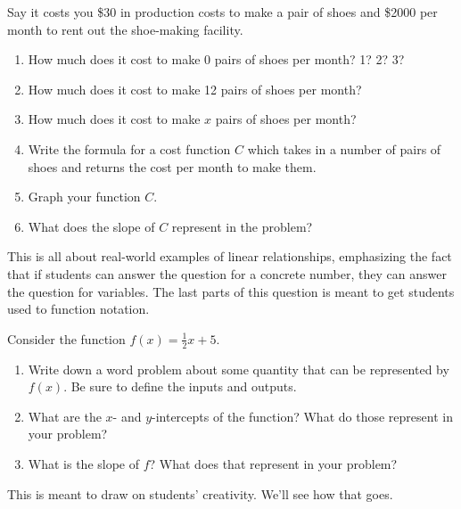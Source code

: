 \documentclass[noauthor]{ximera}
\begin{document}
\begin{problem}
Say it costs you \$30 in production costs to make a pair
of shoes and \$2000 per month to rent out the shoe-making
facility.

\begin{enumerate}
    \item How much does it cost to 
    make 0 pairs of shoes per month? 1? 2? 3? 
    \item How much does it cost to 
    make 12 pairs of shoes per month?
    \item How much does it cost to 
    make \(x\) pairs of shoes per month? 
    \item Write the formula for a cost function \(C\)
    which takes in a number of pairs of shoes and
    returns the cost per month to make them.
    \item Graph your function \(C\).
    \item What does the slope of \(C\) represent
    in the problem?
\end{enumerate}

\begin{instructorNotes}
This is all about real-world examples of linear relationships,
emphasizing the fact that if students can answer the question 
for a concrete number, they can answer the question for 
variables. The last parts of this question is meant to 
get students used to function notation. 
\end{instructorNotes}


\end{problem}

\begin{problem}
Consider the function \(f(x) = \frac{1}{2}x + 5\).

\begin{enumerate}
    \item Write down a word problem about some
    quantity that can be represented by \(f(x)\).
    Be sure to define the inputs and outputs.
    \item What are the \(x\)- and \(y\)-intercepts
    of the function? What do those represent
    in your problem?
    \item What is the slope of \(f\)? What does 
    that represent in your problem?
\end{enumerate}

\begin{instructorNotes}
This is meant to draw on students' creativity. We'll see how that goes.
\end{instructorNotes}
\end{problem}
\end{document}
